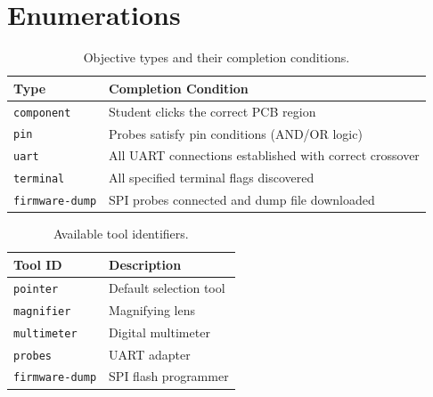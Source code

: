 \section{Enumerations}\label{sec:app-enums}

\begin{table}[H]
\centering
\caption{Objective types and their completion conditions.}
\label{tab:obj-types}
\begin{tabularx}{\textwidth}{lX}
\toprule
\textbf{Type} & \textbf{Completion Condition} \\
\midrule
\texttt{component} & Student clicks the correct PCB region \\
\texttt{pin}       & Probes satisfy pin conditions (AND/OR logic) \\
\texttt{uart}      & All UART connections established with correct crossover \\
\texttt{terminal}  & All specified terminal flags discovered \\
\texttt{firmware-dump} & SPI probes connected and dump file downloaded \\
\bottomrule
\end{tabularx}
\end{table}

\begin{table}[H]
\centering
\caption{Available tool identifiers.}
\label{tab:tools}
\begin{tabular}{ll}
\toprule
\textbf{Tool ID} & \textbf{Description} \\
\midrule
\texttt{pointer}       & Default selection tool \\
\texttt{magnifier}     & Magnifying lens \\
\texttt{multimeter}    & Digital multimeter \\
\texttt{probes}        & UART adapter \\
\texttt{firmware-dump} & SPI flash programmer \\
\bottomrule
\end{tabular}
\end{table}

